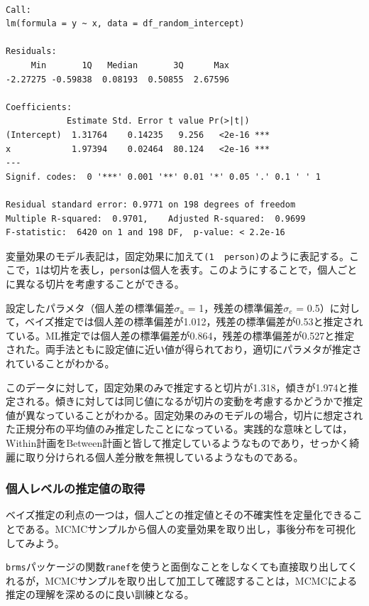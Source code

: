 \documentclass[
  a4paper,
]{ltjsbook}
\begin{document}
\begin{verbatim}

Call:
lm(formula = y ~ x, data = df_random_intercept)

Residuals:
     Min       1Q   Median       3Q      Max 
-2.27275 -0.59838  0.08193  0.50855  2.67596 

Coefficients:
            Estimate Std. Error t value Pr(>|t|)    
(Intercept)  1.31764    0.14235   9.256   <2e-16 ***
x            1.97394    0.02464  80.124   <2e-16 ***
---
Signif. codes:  0 '***' 0.001 '**' 0.01 '*' 0.05 '.' 0.1 ' ' 1

Residual standard error: 0.9771 on 198 degrees of freedom
Multiple R-squared:  0.9701,    Adjusted R-squared:  0.9699 
F-statistic:  6420 on 1 and 198 DF,  p-value: < 2.2e-16
\end{verbatim}

変量効果のモデル表記は，固定効果に加えて\texttt{(1\ \textbar{}\ person)}のように表記する。ここで，\texttt{1}は切片を表し，\texttt{person}は個人を表す。このようにすることで，個人ごとに異なる切片を考慮することができる。

設定したパラメタ（個人差の標準偏差\(\sigma_u\) =
1，残差の標準偏差\(\sigma_e\) =
0.5）に対して，ベイズ推定では個人差の標準偏差が1.012，残差の標準偏差が0.53と推定されている。ML推定では個人差の標準偏差が0.864，残差の標準偏差が0.527と推定された。両手法ともに設定値に近い値が得られており，適切にパラメタが推定されていることがわかる。

このデータに対して，固定効果のみで推定すると切片が1.318，傾きが1.974と推定される。傾きに対しては同じ値になるが切片の変動を考慮するかどうかで推定値が異なっていることがわかる。固定効果のみのモデルの場合，切片に想定された正規分布の平均値のみ推定したことになっている。実践的な意味としては，Within計画をBetween計画と皆して推定しているようなものであり，せっかく綺麗に取り分けられる個人差分散を無視しているようなものである。

\subsubsection{個人レベルの推定値の取得}\label{ux500bux4ebaux30ecux30d9ux30ebux306eux63a8ux5b9aux5024ux306eux53d6ux5f97}

ベイズ推定の利点の一つは，個人ごとの推定値とその不確実性を定量化できることである。MCMCサンプルから個人の変量効果を取り出し，事後分布を可視化してみよう。

\texttt{brms}パッケージの関数\texttt{ranef}を使うと面倒なことをしなくても直接取り出してくれるが，MCMCサンプルを取り出して加工して確認することは，MCMCによる推定の理解を深めるのに良い訓練となる。
\end{document}
